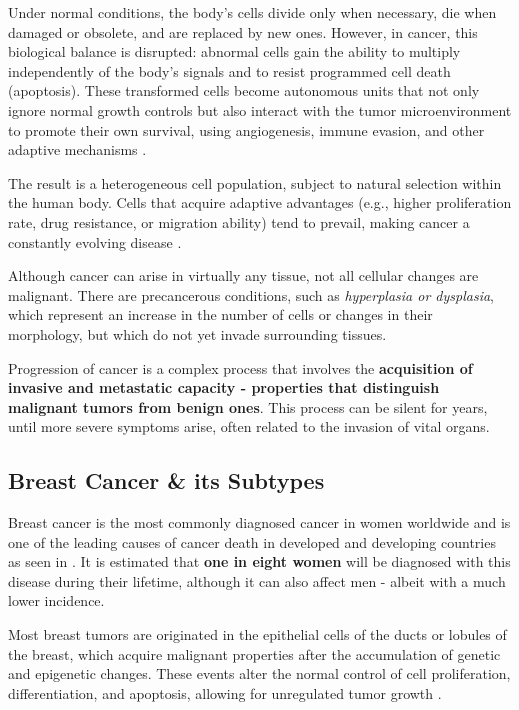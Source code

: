 Under normal conditions, the body's cells divide only when necessary, die when
damaged or obsolete, and are replaced by new ones. However, in cancer, this
biological balance is disrupted: abnormal cells gain the ability to multiply
independently of the body's signals and to resist programmed cell death
(apoptosis). These transformed cells become autonomous units that not only
ignore normal growth controls but also interact with the tumor microenvironment
to promote their own survival, using angiogenesis, immune evasion, and other
adaptive mechanisms \cite{def_of_cancer_Brown2023,NCI2021}.

The result is a heterogeneous cell population, subject to natural selection
within the human body. Cells that acquire adaptive advantages (e.g., higher
proliferation rate, drug resistance, or migration ability) tend to prevail,
making cancer a constantly evolving disease \cite{def_of_cancer_Brown2023}.

Although cancer can arise in virtually any tissue, not all cellular changes are
malignant. There are precancerous conditions, such as \textit{hyperplasia or
  dysplasia}, which represent an increase in the number of cells or changes in
their morphology, but which do not yet invade surrounding tissues.

Progression of cancer is a complex process that involves the
\textbf{acquisition of invasive and metastatic capacity - properties that
  distinguish malignant tumors from benign ones}. This process can be silent for
years, until more severe symptoms arise, often related to the invasion of vital
organs.

\subsection{Breast Cancer \& its Subtypes}

Breast cancer is the most commonly diagnosed cancer in women worldwide and is
one of the leading causes of cancer death in developed and developing countries
as seen in \textcite{BreastEpidemiology_Romanowicz2022,
  updatedbca_Hong2022Breast}. It is estimated that \textbf{one in eight women}
will be diagnosed with this disease during their lifetime, although it can also
affect men - albeit with a much lower incidence.

Most breast tumors are originated in the epithelial cells of the ducts or
lobules of the breast, which acquire malignant properties after the
accumulation of genetic and epigenetic changes. These events alter the normal
control of cell proliferation, differentiation, and apoptosis, allowing for
unregulated tumor growth \cite{origins_and_evolution_bca_Polyak2007}.

